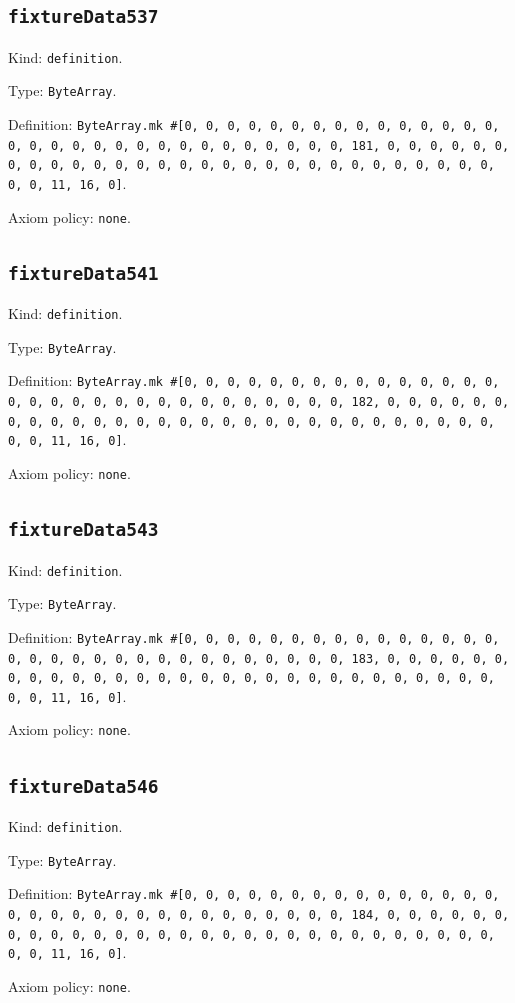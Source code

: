 \documentclass[11pt]{article}
\begin{document}
\subsection*{\texttt{fixtureData537}}
\noindent Kind: \texttt{definition}.\par
\noindent Type: \texttt{ByteArray}.\par
\noindent Definition: \texttt{ByteArray.mk \#[0, 0, 0, 0, 0, 0, 0, 0, 0, 0, 0, 0, 0, 0, 0, 0, 0, 0, 0, 0, 0, 0, 0, 0, 0, 0, 0, 0, 0, 0, 0, 181, 0, 0, 0, 0, 0, 0, 0, 0, 0, 0, 0, 0, 0, 0, 0, 0, 0, 0, 0, 0, 0, 0, 0, 0, 0, 0, 0, 0, 0, 0, 0, 11, 16, 0]}.\par
\noindent Axiom policy: \texttt{none}.\par
\subsection*{\texttt{fixtureData541}}
\noindent Kind: \texttt{definition}.\par
\noindent Type: \texttt{ByteArray}.\par
\noindent Definition: \texttt{ByteArray.mk \#[0, 0, 0, 0, 0, 0, 0, 0, 0, 0, 0, 0, 0, 0, 0, 0, 0, 0, 0, 0, 0, 0, 0, 0, 0, 0, 0, 0, 0, 0, 0, 182, 0, 0, 0, 0, 0, 0, 0, 0, 0, 0, 0, 0, 0, 0, 0, 0, 0, 0, 0, 0, 0, 0, 0, 0, 0, 0, 0, 0, 0, 0, 0, 11, 16, 0]}.\par
\noindent Axiom policy: \texttt{none}.\par
\subsection*{\texttt{fixtureData543}}
\noindent Kind: \texttt{definition}.\par
\noindent Type: \texttt{ByteArray}.\par
\noindent Definition: \texttt{ByteArray.mk \#[0, 0, 0, 0, 0, 0, 0, 0, 0, 0, 0, 0, 0, 0, 0, 0, 0, 0, 0, 0, 0, 0, 0, 0, 0, 0, 0, 0, 0, 0, 0, 183, 0, 0, 0, 0, 0, 0, 0, 0, 0, 0, 0, 0, 0, 0, 0, 0, 0, 0, 0, 0, 0, 0, 0, 0, 0, 0, 0, 0, 0, 0, 0, 11, 16, 0]}.\par
\noindent Axiom policy: \texttt{none}.\par
\subsection*{\texttt{fixtureData546}}
\noindent Kind: \texttt{definition}.\par
\noindent Type: \texttt{ByteArray}.\par
\noindent Definition: \texttt{ByteArray.mk \#[0, 0, 0, 0, 0, 0, 0, 0, 0, 0, 0, 0, 0, 0, 0, 0, 0, 0, 0, 0, 0, 0, 0, 0, 0, 0, 0, 0, 0, 0, 0, 184, 0, 0, 0, 0, 0, 0, 0, 0, 0, 0, 0, 0, 0, 0, 0, 0, 0, 0, 0, 0, 0, 0, 0, 0, 0, 0, 0, 0, 0, 0, 0, 11, 16, 0]}.\par
\noindent Axiom policy: \texttt{none}.\par
\end{document}

